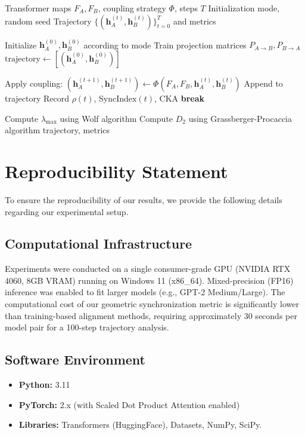 \documentclass[10pt]{article} %
\theoremstyle{plain}
\theoremstyle{definition}
\theoremstyle{remark}
\renewcommand{\vect}[1]{\bm{#1}}
\begin{document}
\begin{algorithm}[H]
\caption{Coupled Dynamics Test}
\label{alg:coupled}
\begin{algorithmic}[1]
\Require Transformer maps $F_A, F_B$, coupling strategy $\Phi$, steps $T$
\Require Initialization mode, random seed
\Ensure Trajectory $\{(\vect{h}_A^{(t)}, \vect{h}_B^{(t)})\}_{t=0}^T$ and metrics

\State Initialize $\vect{h}_A^{(0)}, \vect{h}_B^{(0)}$ according to mode
    \State Train projection matrices $P_{A \to B}, P_{B \to A}$
\EndIf
\State $\text{trajectory} \gets [(\vect{h}_A^{(0)}, \vect{h}_B^{(0)})]$

    \State Apply coupling: $(\vect{h}_A^{(t+1)}, \vect{h}_B^{(t+1)}) \gets \Phi(F_A, F_B, \vect{h}_A^{(t)}, \vect{h}_B^{(t)})$
    \State Append to trajectory
    \State Record $\rho(t)$, $\text{SyncIndex}(t)$, CKA
        \State \textbf{break}
    \EndIf
\EndFor

\State Compute $\lambda_{\max}$ using Wolf algorithm
\State Compute $D_2$ using Grassberger-Procaccia algorithm
\State \Return trajectory, metrics
\end{algorithmic}
\end{algorithm}

\section{Reproducibility Statement}
\label{app:reproducibility}

To ensure the reproducibility of our results, we provide the following details regarding our experimental setup.

\subsection{Computational Infrastructure}
Experiments were conducted on a single consumer-grade GPU (NVIDIA RTX 4060, 8GB VRAM) running on Windows 11 (x86\_64). Mixed-precision (FP16) inference was enabled to fit larger models (e.g., GPT-2 Medium/Large). The computational cost of our geometric synchronization metric is significantly lower than training-based alignment methods, requiring approximately 30 seconds per model pair for a 100-step trajectory analysis.

\subsection{Software Environment}
\begin{itemize}
    \item \textbf{Python:} 3.11
    \item \textbf{PyTorch:} 2.x (with Scaled Dot Product Attention enabled)
    \item \textbf{Libraries:} Transformers (HuggingFace), Datasets, NumPy, SciPy.
\end{itemize}
\end{document}
